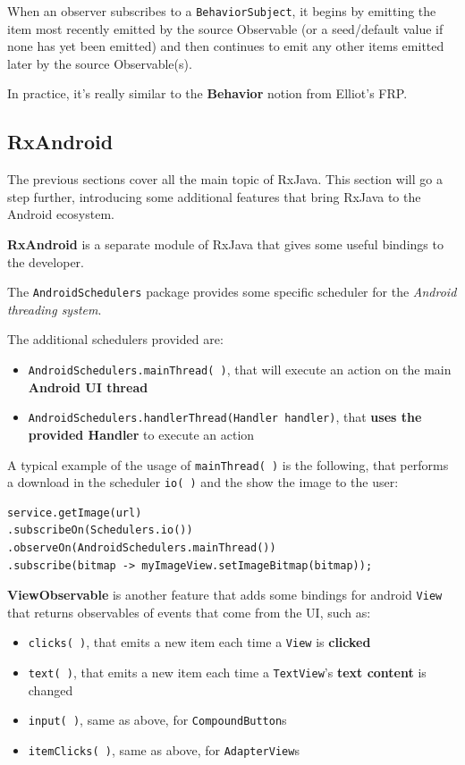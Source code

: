 When an observer subscribes to a \texttt{BehaviorSubject}, it begins by
emitting the item most recently emitted by the source Observable (or a
seed/default value if none has yet been emitted) and then continues to
emit any other items emitted later by the source Observable(s).

In practice, it's really similar to the \textbf{Behavior} notion from
Elliot's FRP.

\subsection{RxAndroid}\label{rxandroid}

The previous sections cover all the main topic of RxJava. This section
will go a step further, introducing some additional features that bring
RxJava to the Android ecosystem.

\textbf{RxAndroid} is a separate module of RxJava that gives some
useful bindings to the developer.

The \texttt{AndroidSchedulers} package provides some specific scheduler
for the \emph{Android threading system}.

The additional schedulers provided are:

\begin{itemize}
\itemsep1pt\parskip0pt
\item
  \texttt{AndroidSchedulers.mainThread(\ )}, that will execute an action
  on the main \textbf{Android UI thread}
\item
  \texttt{AndroidSchedulers.handlerThread(Handler\ handler)}, that
  \textbf{uses the provided Handler} to execute an action
\end{itemize}

A typical example of the usage of \texttt{mainThread(\ )} is the
following, that performs a download in the scheduler \texttt{io(\ )} and
the show the image to the user:

\begin{verbatim}
service.getImage(url)
.subscribeOn(Schedulers.io())
.observeOn(AndroidSchedulers.mainThread())
.subscribe(bitmap -> myImageView.setImageBitmap(bitmap));
\end{verbatim}

\textbf{ViewObservable} is another feature that adds some bindings for
android \texttt{View} that returns observables of events that come from
the UI, such as:

\begin{itemize}
\itemsep1pt\parskip0pt
\item
  \texttt{clicks(\ )}, that emits a new item each time a \texttt{View}
  is \textbf{clicked}
\item
  \texttt{text(\ )}, that emits a new item each time a
  \texttt{TextView}'s \textbf{text content} is changed
\item
  \texttt{input(\ )}, same as above, for \texttt{CompoundButton}s
\item
  \texttt{itemClicks(\ )}, same as above, for \texttt{AdapterView}s
\end{itemize}


